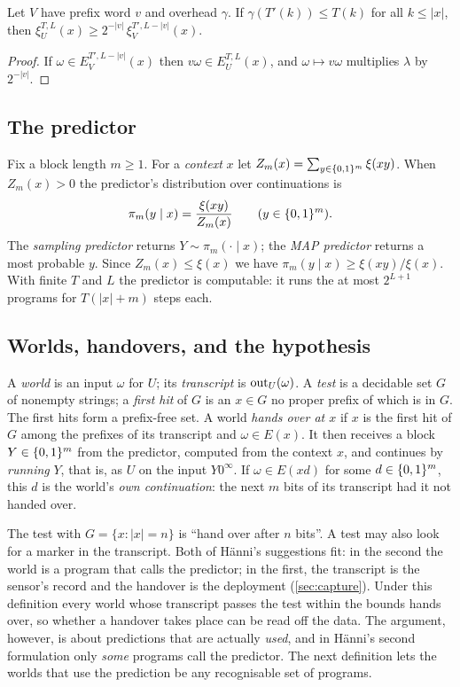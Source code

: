 \begin{lemma}[Transfer]\label{lem:transfer}
Let $V$ have prefix word $v$ and overhead $\gamma$. If $\gamma(T'(k))\le T(k)$ for all $k\le|x|$, then
$\xi_U^{T,L}(x)\ge2^{-|v|}\,\xi_V^{T',L-|v|}(x)$.
\end{lemma}
\begin{proof}
If $\omega\in E_V^{T',L-|v|}(x)$ then $v\omega\in E_U^{T,L}(x)$, and $\omega\mapsto v\omega$ multiplies
$\lambda$ by $2^{-|v|}$.
\end{proof}

\subsection{The predictor}

Fix a block length $m\ge1$. For a \emph{context} $x$ let $Z_m(x)=\sum_{y\in\{0,1\}^m}\xi(xy)$. When $Z_m(x)>0$ the
predictor's distribution over continuations is
\[
\pi_m(y\mid x)=\frac{\xi(xy)}{Z_m(x)}\qquad(y\in\{0,1\}^m).
\]
The \emph{sampling predictor} returns $Y\sim\pi_m(\cdot\mid x)$; the \emph{MAP predictor} returns a most
probable $y$. Since $Z_m(x)\le\xi(x)$ we have $\pi_m(y\mid x)\ge\xi(xy)/\xi(x)$. With finite $T$ and $L$ the
predictor is computable: it runs the at most $2^{L+1}$ programs for $T(|x|+m)$ steps each.

\subsection{Worlds, handovers, and the hypothesis}

\begin{definition}\label{def:world}
A \emph{world} is an input $\omega$ for $U$; its \emph{transcript} is $\mathrm{out}_U(\omega)$. A \emph{test} is a
decidable set $G$ of nonempty strings; a \emph{first hit} of $G$ is an $x\in G$ no proper prefix of which is
in $G$.
The first hits form a prefix-free set. A world \emph{hands over at $x$} if $x$ is the first hit of $G$ among
the prefixes of its transcript and $\omega\in E(x)$. It then receives a block $Y\in\{0,1\}^m$ from the predictor,
computed from the context $x$, and continues by \emph{running} $Y$, that is, as $U$ on the input $Y0^\infty$.
If $\omega\in E(xd)$ for some $d\in\{0,1\}^m$, this $d$ is the world's \emph{own continuation}: the next $m$ bits
of
its transcript had it not handed over.
\end{definition}

The test with $G=\{x:|x|=n\}$ is ``hand over after $n$ bits''. A test may also look for a marker in the
transcript. Both of H\"anni's suggestions fit: in the second the world is a program that calls the predictor;
in the first, the transcript is the sensor's record and the handover is the deployment (\cref{sec:capture}).
Under this definition every world whose transcript passes the test within the bounds hands over, so whether
a handover takes place can be read off the data. The argument, however, is about predictions that are
actually \emph{used}, and in H\"anni's second formulation only \emph{some} programs call the predictor. The
next definition lets the worlds that use the prediction be any recognisable set of programs.

